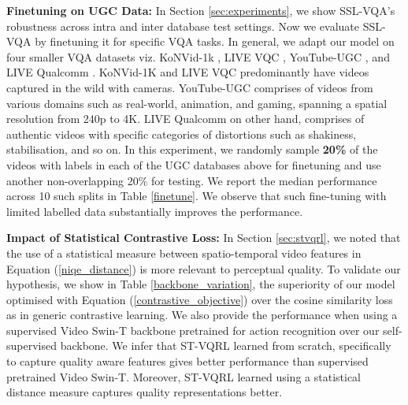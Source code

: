 \documentclass[10pt,twocolumn,letterpaper]{article}
\begin{document}
\textbf{Finetuning on UGC Data:}
In Section \ref{sec:experiments}, we show SSL-VQA's robustness across intra and inter database test settings. Now we evaluate SSL-VQA by finetuning it for specific VQA tasks. In general, we adapt our model on four smaller VQA datasets viz. KoNVid-1k \cite{konvid}, LIVE VQC \cite{livevqc}, YouTube-UGC \cite{youtube_ugc}, and LIVE Qualcomm \cite{liveqcomm}. KoNVid-1K and LIVE VQC predominantly have videos captured in the wild with cameras. YouTube-UGC comprises of videos from various domains such as real-world, animation, and gaming, spanning a spatial resolution from 240p to 4K. LIVE Qualcomm on other hand, comprises of authentic videos with specific categories of distortions such as shakiness, stabilisation, and so on. In this experiment, we randomly sample \textbf{20\%} of the videos with labels in each of the UGC databases above for finetuning and use another non-overlapping 20\% for testing. We report the median performance across 10 such splits in Table \ref{finetune}. We observe that such fine-tuning with limited labelled data substantially improves the performance. 

\textbf{Impact of Statistical Contrastive Loss:}
In Section \ref{sec:stvqrl}, we noted that the use of a statistical measure between spatio-temporal video features in Equation (\ref{niqe_distance}) is more relevant to perceptual quality. To validate our hypothesis, we show in Table \ref{backbone_variation}, the superiority of our model optimised with Equation (\ref{contrastive_objective}) over the cosine similarity loss as in generic contrastive learning. We also provide the performance when using a supervised Video Swin-T backbone \cite{video_swin_t} pretrained for action recognition over our self-supervised backbone. We infer that ST-VQRL learned from scratch, specifically to capture quality aware features gives better performance than supervised pretrained Video Swin-T. Moreover, ST-VQRL learned using a statistical distance measure captures quality representations better. 
\end{document}
